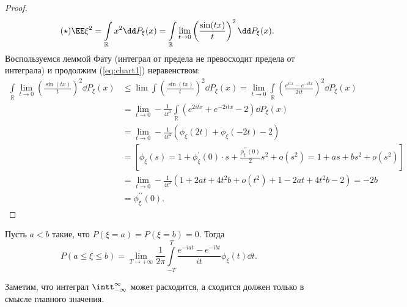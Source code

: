  \begin{proof}
 \begin{equation*}\label{eq:chart1}\tag{$\star$}
     \EE \xi^2 = \int\limits_\mathbb{R}x^2\dd P_\xi(x) = \int\limits_\mathbb{R} \underset{t\rightarrow 0}{\lim}\left(\frac{\sin(tx)}{t}\right)^2\dd P_\xi(x). 
 \end{equation*}
 Воспользуемся леммой Фату (интеграл от предела не превосходит предела от интеграла) и продолжим (\ref{eq:chart1}) неравенством:
    \begin{align*}
         \int\limits_\mathbb{R}\underset{t\rightarrow 0}{\lim}(\frac{\sin(tx)}{t})^2\dd P_\xi(x) &\le \lim\int (\frac{\sin(tx)}{t})^2\dd P_\xi(x)=
         \underset{t\rightarrow 0}{\lim} \int\limits_\mathbb{R} (\frac{e^{itx} - e^{-itx}}{2it})^2\dd P_\xi(x) \\&=
         \underset{t\rightarrow 0}{\lim} - \frac{1}{4t^2}\int\limits_\mathbb{R}(e^{2itx} +e^{-2itx} - 2) \dd P_\xi(x) \\&=
         \underset{t\rightarrow 0}{\lim}-\frac{1}{4t^2}(\phi_\xi(2t) + \phi_\xi(-2t) - 2) \\&= [\phi_\xi(s) = 1 + \phi_\xi ^ \prime(0)\cdot s + \frac{\phi_\xi^{\prime \prime}(0)}{2}s^2 + o(s^2) = 1 + as + bs^2 + o(s^2)] \\&= \underset{t\rightarrow 0}{\lim} -\frac{1}{4t^2}(1 + 2at + 4t^2 b + o(t^2) + 1 - 2at + 4t^2b - 2) = -2b \\&= \phi_\xi^{\prime \prime}(0).
    \end{align*}


 \end{proof}


 \begin{theorem}
     Пусть $a < b$ такие, что $P(\xi = a) = P(\xi = b) = 0$.
     Тогда 
     \begin{equation*}\label{eq:formula_obr}\tag{$\dagger$}
         P(a\le \xi\le b) =  \underset{T\rightarrow+\infty}{\lim}\frac{1}{2\pi}\int\limits_{-T}^T \frac{e^{-iat} - e^{-ibt}}{it}\phi_\xi(t) \dd t.
     \end{equation*}
 \end{theorem}
    
    Заметим, что интеграл $\intt_{-\infty}^{\infty}$ может расходится, а сходится должен только в смысле главного значения.

